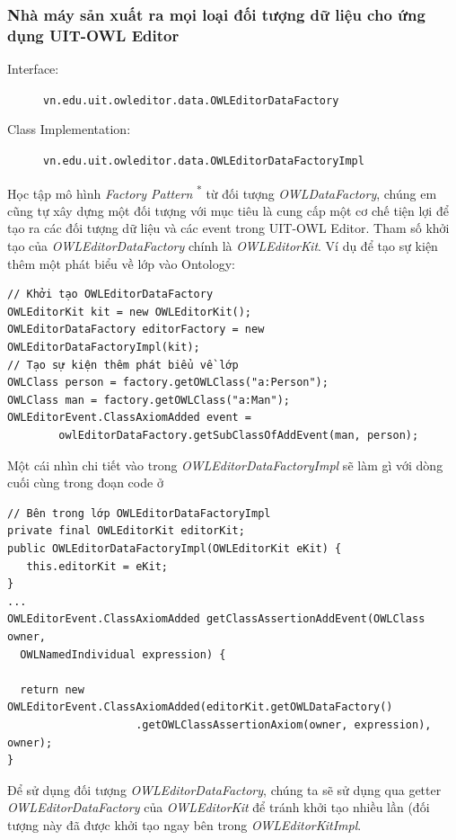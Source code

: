 \subsubsection{Nhà máy sản xuất ra mọi loại đối tượng dữ liệu cho ứng dụng UIT-OWL Editor}
{\let\thefootnote\relax{}
}
\begin{description}
\item[Interface:] \verb|vn.edu.uit.owleditor.data.OWLEditorDataFactory|
\item[Class Implementation:] \verb|vn.edu.uit.owleditor.data.OWLEditorDataFactoryImpl|
\end{description}
Học tập mô hình \textit{Factory Pattern} \textsuperscript{*} từ đối tượng \textit{OWLDataFactory}, chúng em cũng tự xây dựng một đối tượng với mục tiêu là cung cấp một cơ chế tiện lợi để tạo ra các đối tượng dữ liệu và các event trong UIT-OWL Editor. Tham số khởi tạo của \textit{OWLEditorDataFactory} chính là \textit{OWLEditorKit}. Ví dụ để tạo sự kiện thêm một phát biểu về lớp vào Ontology:
\begin{verbatim}
// Khởi tạo OWLEditorDataFactory
OWLEditorKit kit = new OWLEditorKit();
OWLEditorDataFactory editorFactory = new OWLEditorDataFactoryImpl(kit);
// Tạo sự kiện thêm phát biểu về lớp
OWLClass person = factory.getOWLClass("a:Person");
OWLClass man = factory.getOWLClass("a:Man");
OWLEditorEvent.ClassAxiomAdded event =
        owlEditorDataFactory.getSubClassOfAddEvent(man, person);
\end{verbatim}
Một cái nhìn chi tiết vào trong \textit{OWLEditorDataFactoryImpl} sẽ làm gì với dòng cuối cùng trong đoạn code ở 
\begin{verbatim}
// Bên trong lớp OWLEditorDataFactoryImpl
private final OWLEditorKit editorKit;
public OWLEditorDataFactoryImpl(OWLEditorKit eKit) {
   this.editorKit = eKit;
}
...
OWLEditorEvent.ClassAxiomAdded getClassAssertionAddEvent(OWLClass owner,
  OWLNamedIndividual expression) {

  return new OWLEditorEvent.ClassAxiomAdded(editorKit.getOWLDataFactory()
                    .getOWLClassAssertionAxiom(owner, expression), owner);
}
\end{verbatim}
Để sử dụng đối tượng \textit{OWLEditorDataFactory}, chúng ta sẽ sử dụng qua getter \textit{OWLEditorDataFactory} của \textit{OWLEditorKit} để tránh khởi tạo nhiều lần (đối tượng này đã được khởi tạo ngay bên trong \textit{OWLEditorKitImpl}.

